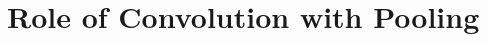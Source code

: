 \section{Role of Convolution with Pooling}
\FloatBarrier
\begin{figure}[H]
\centering
{}
\end{figure}